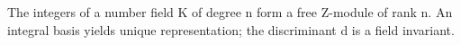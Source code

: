 The integers of a number field K of degree n form a free Z-module of rank n. An integral basis yields unique representation; the discriminant d is a field invariant.
